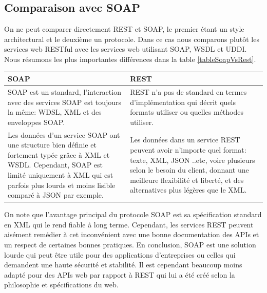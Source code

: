 \subsection{Comparaison avec SOAP}
On ne peut comparer directement REST et SOAP, le premier étant un style architectural et le deuxième un protocole. Dans ce cas nous comparons plutôt les services web RESTful avec les services web utilisant SOAP, WSDL et UDDI.
Nous résumons les plus importantes différences dans la table \ref{tableSoapVsRest}.\newline
\begin{tabu} to \textwidth {| X[l] | X[l] |}
\hline
{} 
SOAP & REST \\
\hline
   SOAP est un standard, l'interaction avec des services SOAP est toujours la même: WDSL, XML et des enveloppes SOAP.
   &
   REST n'a pas de standard en termes d'implémentation qui décrit quels formats utiliser ou quelles méthodes utiliser. \\
   \hline
   Les données d'un service SOAP ont une structure bien définie et fortement typée grâce à XML et WSDL.
   Cependant, SOAP est limité uniquement à XML qui est parfois plus lourds et moins lisible comparé à JSON par exemple.
   &  
   Les données dans un service REST peuvent avoir n'importe quel format: texte, XML, JSON ..etc, voire plusieurs selon le besoin du client, donnant une meilleure flexibilité et liberté, et des alternatives plus légères que le XML.\\
   \hline
\end{tabu}
   \label{tableSoapVsRest}

On note que l'avantage principal du protocole SOAP est sa spécification standard en XML qui le rend fiable à long terme. Cependant, les services REST peuvent aisément remédier à cet inconvénient avec une bonne documentation des APIs et un respect de certaines bonnes pratiques.
\newline
En conclusion, SOAP est une solution lourde qui peut être utile pour des applications d'entreprises ou celles qui demandent une haute sécurité et stabilité. Il est cependant beaucoup moins adapté pour des APIs web par rapport à REST qui lui a été créé selon la philosophie et spécifications du web.

